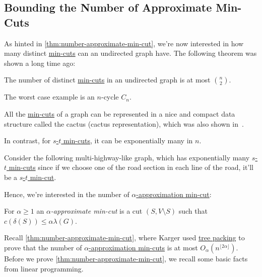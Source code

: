 \subsection{Bounding the Number of Approximate Min-Cuts}
As hinted in \autoref{thm:number-approximate-min-cut}, we're now interested in how many distinct \hyperref[prb:global-min-cut]{min-cuts} can an undirected graph have. The following theorem was shown a long time ago:

\begin{theorem}
	The number of distinct \hyperref[prb:global-min-cut]{min-cuts} in an undirected graph is at most \(\binom{n}{2}\).
\end{theorem}

\begin{eg}[Cycle]
	The worst case example is an \(n\)-cycle \(C_n\).
\end{eg}

\begin{remark}
	All the \hyperref[prb:global-min-cut]{min-cuts} of a graph can be represented in a nice and compact data structure called the cactus (cactus representation), which was also shown in~\cite{dinitz1976structure}.
\end{remark}

In contrast, for \hyperref[prb:s-t-min-cut]{\(s\)-\(t\) min-cuts}, it can be exponentially many in \(n\).

\begin{eg}
	Consider the following multi-highway-like graph, which has exponentially many \hyperref[prb:s-t-min-cut]{\(s\)-\(t\) min-cuts} since if we choose one of the road section in each line of the road, it'll be a \hyperref[prb:s-t-min-cut]{\(s\)-\(t\) min-cut}.
	\begin{center}
	\end{center}
\end{eg}

Hence, we're interested in the number of \hyperref[def:approximate-min-cut]{\(\alpha \)-approximation min-cut}:

\begin{definition}\label{def:approximate-min-cut}
	For \(\alpha \geq 1\) an \emph{\(\alpha \)-approximate min-cut} is a cut \((S, V \setminus S)\) such that \(c(\delta (S)) \leq \alpha \lambda (G)\).
\end{definition}

Recall \autoref{thm:number-approximate-min-cut}, where Karger used \hyperref[prb:tree-packing]{tree packing} to prove that the number of \hyperref[def:approximate-min-cut]{\(\alpha \)-approximation min-cuts} is at most \(O_\alpha (n^{\lfloor 2\alpha \rfloor })\). Before we prove \autoref{thm:number-approximate-min-cut}, we recall some basic facts from linear programming.

